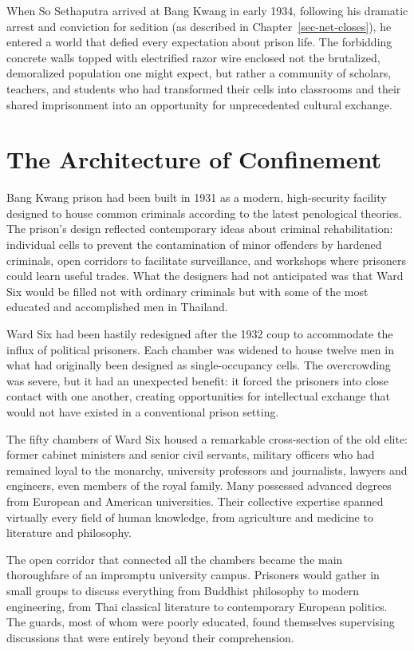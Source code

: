 \documentclass[
  Letterpaper,
]{scrbook}
\begin{document}
When So Sethaputra arrived at Bang Kwang in early 1934, following his
dramatic arrest and conviction for sedition (as described in
Chapter~\ref{sec-net-closes}), he entered a world that defied every
expectation about prison life. The forbidding concrete walls topped with
electrified razor wire enclosed not the brutalized, demoralized
population one might expect, but rather a community of scholars,
teachers, and students who had transformed their cells into classrooms
and their shared imprisonment into an opportunity for unprecedented
cultural exchange.

\section{The Architecture of
Confinement}\label{the-architecture-of-confinement}

Bang Kwang prison had been built in 1931 as a modern, high-security
facility designed to house common criminals according to the latest
penological theories. The prison's design reflected contemporary ideas
about criminal rehabilitation: individual cells to prevent the
contamination of minor offenders by hardened criminals, open corridors
to facilitate surveillance, and workshops where prisoners could learn
useful trades. What the designers had not anticipated was that Ward Six
would be filled not with ordinary criminals but with some of the most
educated and accomplished men in Thailand.

Ward Six had been hastily redesigned after the 1932 coup to accommodate
the influx of political prisoners. Each chamber was widened to house
twelve men in what had originally been designed as single-occupancy
cells. The overcrowding was severe, but it had an unexpected benefit: it
forced the prisoners into close contact with one another, creating
opportunities for intellectual exchange that would not have existed in a
conventional prison setting.

The fifty chambers of Ward Six housed a remarkable cross-section of the
old elite: former cabinet ministers and senior civil servants, military
officers who had remained loyal to the monarchy, university professors
and journalists, lawyers and engineers, even members of the royal
family. Many possessed advanced degrees from European and American
universities. Their collective expertise spanned virtually every field
of human knowledge, from agriculture and medicine to literature and
philosophy.

The open corridor that connected all the chambers became the main
thoroughfare of an impromptu university campus. Prisoners would gather
in small groups to discuss everything from Buddhist philosophy to modern
engineering, from Thai classical literature to contemporary European
politics. The guards, most of whom were poorly educated, found
themselves supervising discussions that were entirely beyond their
comprehension.
\end{document}
